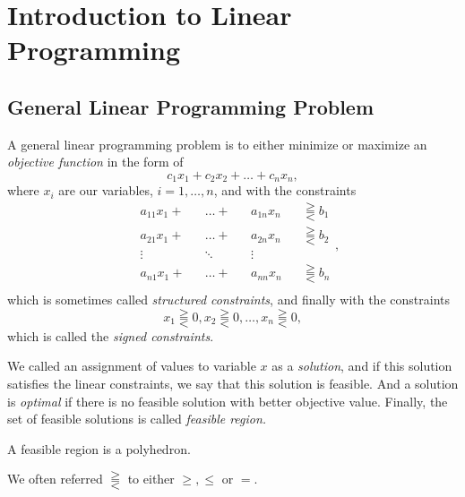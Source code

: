 \section{Introduction to Linear Programming}
\subsection{General Linear Programming Problem}
A general linear programming problem is to either minimize or maximize an \emph{objective function} in the form of
\[
	c_1 x_1 + c_2 x_2 + \ldots +c_n x_n,
\]
where \(x_{i}\) are our variables, \(i = 1, \ldots, n\), and with the constraints
\[
	\begin{alignedat}{4}
		&a_{11} x_1 + &&\ldots + &&a_{1n}x_n &&\gtreqqless b_1\\
		&a_{21} x_1 + &&\ldots + &&a_{2n}x_n &&\gtreqqless b_2\\
		&\vdots &&\ddots &&\vdots && \\
		&a_{n1} x_1 + &&\ldots + &&a_{nn}x_n &&\gtreqqless b_n\\
	\end{alignedat},
\]
which is sometimes called \emph{structured constraints}, and finally with the constraints
\[
	x_1 \gtreqqless 0, x_2\gtreqqless 0, \ldots ,x_n\gtreqqless 0,
\]
which is called the \emph{signed constraints}.

We called an assignment of values to variable \(x\) as a \emph{solution}, and if this solution satisfies the linear constraints, we say that
this solution is feasible. And a solution is \emph{optimal} if there is no feasible solution with better objective value. Finally, the set of feasible
solutions is called \emph{feasible region.}

\begin{remark}
	A feasible region is a polyhedron.
\end{remark}


\begin{notation}
	We often referred \(\gtreqqless \) to either \(\geq , \leq\) or \(=\).
\end{notation}

